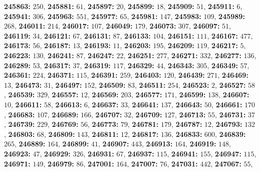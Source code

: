 \textsf{\bfseries 245863:} $250$, \textsf{\bfseries 245881:} $61$, \textsf{\bfseries 245897:} $20$, \textsf{\bfseries 245899:} $18$, \textsf{\bfseries 245909:} $51$, \textsf{\bfseries 245911:} $6$, \textsf{\bfseries 245941:} $306$, \textsf{\bfseries 245963:} $551$, \textsf{\bfseries 245977:} $65$, \textsf{\bfseries 245981:} $147$, \textsf{\bfseries 245983:} $109$, \textsf{\bfseries 245989:} $268$, \textsf{\bfseries 246011:} $214$, \textsf{\bfseries 246017:} $107$, \textsf{\bfseries 246049:} $179$, \textsf{\bfseries 246073:} $307$, \textsf{\bfseries 246097:} $51$, \textsf{\bfseries 246119:} $34$, \textsf{\bfseries 246121:} $67$, \textsf{\bfseries 246131:} $87$, \textsf{\bfseries 246133:} $104$, \textsf{\bfseries 246151:} $111$, \textsf{\bfseries 246167:} $477$, \textsf{\bfseries 246173:} $56$, \textsf{\bfseries 246187:} $13$, \textsf{\bfseries 246193:} $11$, \textsf{\bfseries 246203:} $195$, \textsf{\bfseries 246209:} $119$, \textsf{\bfseries 246217:} $5$, \textsf{\bfseries 246223:} $130$, \textsf{\bfseries 246241:} $87$, \textsf{\bfseries 246247:} $22$, \textsf{\bfseries 246251:} $277$, \textsf{\bfseries 246271:} $332$, \textsf{\bfseries 246277:} $136$, \textsf{\bfseries 246289:} $53$, \textsf{\bfseries 246317:} $37$, \textsf{\bfseries 246319:} $117$, \textsf{\bfseries 246329:} $44$, \textsf{\bfseries 246343:} $305$, \textsf{\bfseries 246349:} $57$, \textsf{\bfseries 246361:} $224$, \textsf{\bfseries 246371:} $115$, \textsf{\bfseries 246391:} $259$, \textsf{\bfseries 246403:} $120$, \textsf{\bfseries 246439:} $271$, \textsf{\bfseries 246469:} $13$, \textsf{\bfseries 246473:} $31$, \textsf{\bfseries 246497:} $152$, \textsf{\bfseries 246509:} $83$, \textsf{\bfseries 246511:} $254$, \textsf{\bfseries 246523:} $2$, \textsf{\bfseries 246527:} $58$, \textsf{\bfseries 246539:} $329$, \textsf{\bfseries 246557:} $12$, \textsf{\bfseries 246569:} $203$, \textsf{\bfseries 246577:} $171$, \textsf{\bfseries 246599:} $138$, \textsf{\bfseries 246607:} $10$, \textsf{\bfseries 246611:} $58$, \textsf{\bfseries 246613:} $6$, \textsf{\bfseries 246637:} $33$, \textsf{\bfseries 246641:} $137$, \textsf{\bfseries 246643:} $50$, \textsf{\bfseries 246661:} $170$, \textsf{\bfseries 246683:} $107$, \textsf{\bfseries 246689:} $166$, \textsf{\bfseries 246707:} $32$, \textsf{\bfseries 246709:} $127$, \textsf{\bfseries 246713:} $55$, \textsf{\bfseries 246731:} $37$, \textsf{\bfseries 246739:} $229$, \textsf{\bfseries 246769:} $56$, \textsf{\bfseries 246773:} $79$, \textsf{\bfseries 246781:} $179$, \textsf{\bfseries 246787:} $12$, \textsf{\bfseries 246793:} $132$, \textsf{\bfseries 246803:} $68$, \textsf{\bfseries 246809:} $143$, \textsf{\bfseries 246811:} $12$, \textsf{\bfseries 246817:} $136$, \textsf{\bfseries 246833:} $600$, \textsf{\bfseries 246839:} $265$, \textsf{\bfseries 246889:} $164$, \textsf{\bfseries 246899:} $41$, \textsf{\bfseries 246907:} $443$, \textsf{\bfseries 246913:} $164$, \textsf{\bfseries 246919:} $148$, \textsf{\bfseries 246923:} $47$, \textsf{\bfseries 246929:} $326$, \textsf{\bfseries 246931:} $67$, \textsf{\bfseries 246937:} $115$, \textsf{\bfseries 246941:} $155$, \textsf{\bfseries 246947:} $115$, \textsf{\bfseries 246971:} $149$, \textsf{\bfseries 246979:} $86$, \textsf{\bfseries 247001:} $164$, \textsf{\bfseries 247007:} $76$, \textsf{\bfseries 247031:} $442$, \textsf{\bfseries 247067:} $55$, 
